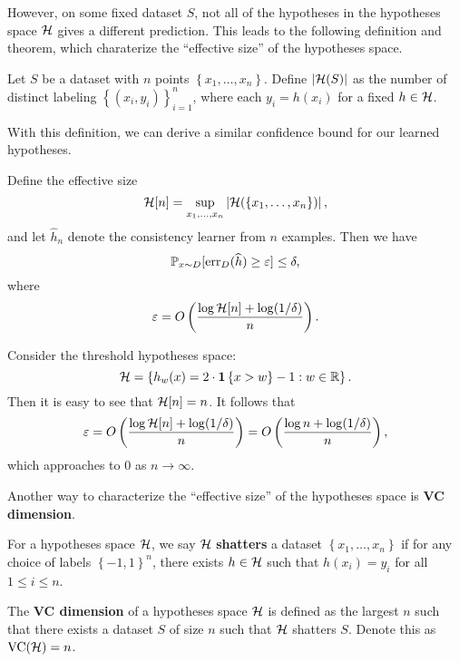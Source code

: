 \documentclass[a4paper]{article}
\begin{document}
However, on some fixed dataset $S$, not all of the hypotheses
in the hypotheses space $\mathcal{H}$ gives a different prediction.
This leads to the following definition and theorem, which
charaterize the ``effective size'' of the hypotheses
space.

\begin{defi}
  Let $S$ be a dataset with $n$ points
  $\left\{ x_1, \dots, x_n \right\}$. Define
  $\left\lvert \mathcal{H}(S)\right\rvert$ as the number of distinct labeling
  $\left\{ (x_i, y_i) \right\}_{i=1}^n$, where each
  $y_i = h(x_i)$ for a fixed $h \in \mathcal{H}$.
\end{defi}

With this definition, we can derive a similar confidence
bound for our learned hypotheses.

\begin{thm}
  Define the effective size
  \[
  \mathcal{H} [n] = \sup_{x_1, \dots, x_n}
  \left\lvert \mathcal{H}(\left\{ x_1, \dots, x_n \right\})\right\rvert,
  \]
  and let $\hat{h}_n$ denote the consistency learner
  from $n$ examples. Then we have
  \[
  \mathbb{P}_{x \sim D} [\operatorname{err}_D(\widehat{h}) \geq \varepsilon] \leq \delta,
  \]
  where
  \[
  \varepsilon = O \left(
    \frac{\log \mathcal{H}[n] + \log (1 / \delta)}{n}
   \right).
  \]
\end{thm}

\begin{eg}
  Consider the threshold hypotheses space:
  \[
  \mathcal{H} = \left\{ h_w(x) = 2 \cdot
  \mathbf{1} \left\{ x > w \right\} - 1 : w \in \mathbb{R} \right\}.
  \]
  Then it is easy to see that $\mathcal{H}[n] = n$.
  It follows that
  \[
  \varepsilon = O\left(
    \frac{\log \mathcal{H}[n] + \log (1 / \delta)}{n}
   \right) = O\left(
    \frac{\log n + \log (1 / \delta)}{n}
   \right),
  \]
  which approaches to $0$ as $n \to \infty$.
\end{eg}

Another way to characterize the ``effective size'' of the
hypotheses space is \textbf{VC dimension}.

\begin{defi}[VC dimension]
  For a hypotheses space $\mathcal{H}$, we say
  $\mathcal{H}$ \textbf{shatters} a dataset
  $\left\{ x_1, \dots, x_n \right\}$ if
  for any choice of labels
  $\left\{ -1, 1 \right\}^n$, there exists
  $h \in \mathcal{H}$ such that $h(x_i) = y_i$
  for all $1 \leq i \leq n$.

  The \textbf{VC dimension} of a hypotheses
  space $\mathcal{H}$ is defined
  as the largest $n$ such that there exists a dataset $S$
  of size $n$ such that $\mathcal{H}$ shatters $S$.
  Denote this as $\operatorname{VC}(\mathcal{H}) = n$.
\end{defi}
\end{document}
